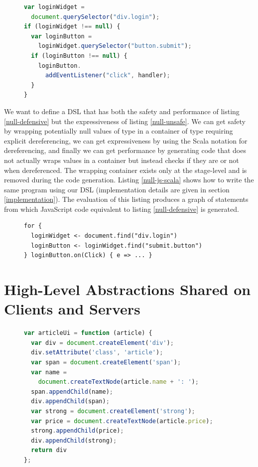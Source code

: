 \documentclass[preprint]{sigplanconf}
\begin{document}
\begin{figure}
\begin{lstlisting}[language=JavaScript,label=null-defensive,caption=Defensive programming to handle null references]
var loginWidget =
  document.querySelector("div.login");
if (loginWidget !== null) {
  var loginButton =
    loginWidget.querySelector("button.submit");
  if (loginButton !== null) {
    loginButton.
      addEventListener("click", handler);
  }
}
\end{lstlisting}
\end{figure}

We want to define a DSL that has both the safety and performance of listing \ref{null-defensive} but the
expressiveness of listing \ref{null-unsafe}. We can get safety by wrapping potentially null values of type
 in a container of type  requiring explicit dereferencing, we can get
expressiveness by using the Scala  notation for dereferencing, and finally we can get performance by
generating code that does not actually wraps values in a container but instead checks if they are  or not
when dereferenced. The wrapping container exists only at the stage-level and is removed during the code generation.
Listing \ref{null-js-scala} shows how to write the same program using our DSL (implementation details are
given in section \ref{implementation}). The evaluation of this listing produces a graph of statements from which
JavaScript code equivalent to listing \ref{null-defensive} is generated.

\begin{figure}
\begin{lstlisting}[label=null-js-scala,caption=Handling null references in js-scala]
for {
  loginWidget <- document.find("div.login")
  loginButton <- loginWidget.find("submit.button")
} loginButton.on(Click) { e => ... }
\end{lstlisting}
\end{figure}


\section{High-Level Abstractions Shared on Clients and Servers}

\begin{figure}
\begin{lstlisting}[language=JavaScript,caption=JavaScript DOM API,label=dom-api]
var articleUi = function (article) {
  var div = document.createElement('div');
  div.setAttribute('class', 'article');
  var span = document.createElement('span');
  var name =
    document.createTextNode(article.name + ': ');
  span.appendChild(name);
  div.appendChild(span);
  var strong = document.createElement('strong');
  var price = document.createTextNode(article.price);
  strong.appendChild(price);
  div.appendChild(strong);
  return div
};
\end{lstlisting}
\end{figure}
\end{document}
